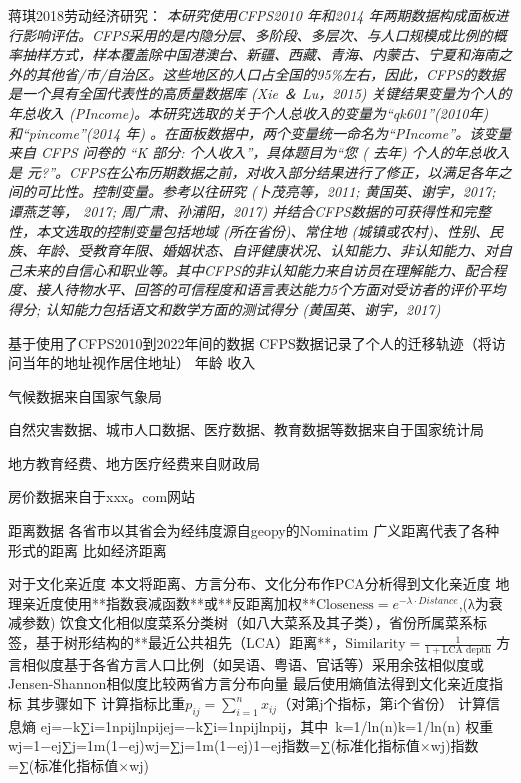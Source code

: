 \documentclass[10pt,a4paper]{article}
\begin{document}
蒋琪2018劳动经济研究：
\textit{本研究使用CFPS2010 年和2014 年两期数据构成面板进行影响评估。CFPS采用的是内隐分层、多阶段、多层次、与人口规模成比例的概率抽样方式，样本覆盖除中国港澳台、新疆、西藏、青海、内蒙古、宁夏和海南之外的其他省/市/自治区。这些地区的人口占全国的95\%左右，因此，CFPS的数据是一个具有全国代表性的高质量数据库 (Xie ＆ Lu，2015) }
\textit{关键结果变量为个人的年总收入 (PIncome)。本研究选取的关于个人总收入的变量为“qk601”(2010年) 和“pincome”(2014 年) 。在面板数据中，两个变量统一命名为“PIncome”。该变量来自 CFPS 问卷的 “K 部分: 个人收入”，具体题目为“您 ( 去年) 个人的年总收入是 元?”。CFPS在公布历期数据之前，对收入部分结果进行了修正，以满足各年之间的可比性。控制变量。参考以往研究 (卜茂亮等，2011; 黄国英、谢宇，2017; 谭燕芝等， 2017; 周广肃、孙浦阳，2017) 并结合CFPS数据的可获得性和完整性，本文选取的控制变量包括地域 (所在省份)、常住地 (城镇或农村)、性别、民族、年龄、受教育年限、婚姻状态、自评健康状况、认知能力、非认知能力、对自己未来的自信心和职业等。其中CFPS的非认知能力来自访员在理解能力、配合程度、接人待物水平、回答的可信程度和语言表达能力5个方面对受访者的评价平均得分; 认知能力包括语文和数学方面的测试得分 (黄国英、谢宇，2017)}


基于使用了CFPS2010到2022年间的数据
CFPS数据记录了个人的迁移轨迹（将访问当年的地址视作居住地址）
年龄
收入

气候数据来自国家气象局

自然灾害数据、城市人口数据、医疗数据、教育数据等数据来自于国家统计局

地方教育经费、地方医疗经费来自财政局

房价数据来自于xxx。com网站

距离数据
各省市以其省会为经纬度源自geopy的Nominatim
广义距离代表了各种形式的距离 比如经济距离

对于文化亲近度
本文将距离、方言分布、文化分布作PCA分析得到文化亲近度
地理亲近度使用**指数衰减函数**或**反距离加权**$\text{Closeness}=e^ {-\lambda \cdot Distance}$,(λ为衰减参数)
饮食文化相似度菜系分类树（如八大菜系及其子类），省份所属菜系标签，基于树形结构的**最近公共祖先（LCA）距离**，$\text{Similarity}=\frac{1}{1+\text{LCA depth}}$
方言相似度基于各省方言人口比例（如吴语、粤语、官话等）采用余弦相似度或Jensen-Shannon相似度比较两省方言分布向量
最后使用熵值法得到文化亲近度指标
其步骤如下
计算指标比重$p_{ij}​=\sum\limits_{i=1}^{n}​x_{ij}​$​​（对第j个指标，第i个省份）
计算信息熵  ej=−k∑i=1npijln⁡pijej​=−k∑i=1n​pij​lnpij​，其中 k=1/ln⁡(n)k=1/ln(n)
权重wj=1−ej∑j=1m(1−ej)wj​=∑j=1m​(1−ej​)1−ej​​
指数=∑(标准化指标值×wj)指数=∑(标准化指标值×wj​)
\end{document}
